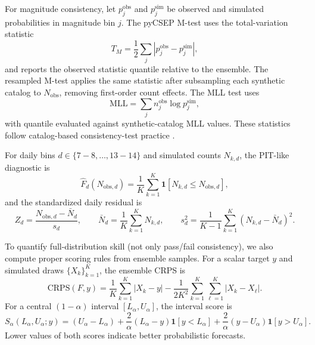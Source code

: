 \documentclass[12pt,letterpaper]{article}
\begin{document}
For magnitude consistency, let $p^{\mathrm{obs}}_j$ and $p^{\mathrm{sim}}_j$
be observed and simulated probabilities in magnitude bin $j$. The pyCSEP
M-test uses the total-variation statistic
\begin{equation}
T_M = \frac{1}{2}\sum_{j}\left|p^{\mathrm{obs}}_j-p^{\mathrm{sim}}_j\right|,
\label{eq:mtest_tv}
\end{equation}
and reports the observed statistic quantile relative to the ensemble. The
resampled M-test applies the same statistic after subsampling each synthetic
catalog to $N_{\mathrm{obs}}$, removing first-order count effects. The MLL
test uses
\begin{equation}
\mathrm{MLL} = \sum_j n^{\mathrm{obs}}_j \log p^{\mathrm{sim}}_j,
\label{eq:mll}
\end{equation}
with quantile evaluated against synthetic-catalog MLL values.
These statistics follow catalog-based consistency-test practice
\cite{savran2020}.

For daily bins $d\in\{7\!-\!8,\ldots,13\!-\!14\}$ and simulated counts
$N_{k,d}$, the PIT-like diagnostic is
\begin{equation}
\hat F_d(N_{\mathrm{obs},d})=
\frac{1}{K}\sum_{k=1}^K \mathbf{1}[N_{k,d}\le N_{\mathrm{obs},d}],
\label{eq:daily_pit}
\end{equation}
and the standardized daily residual is
\begin{equation}
Z_d=\frac{N_{\mathrm{obs},d}-\bar N_d}{s_d},
\qquad
\bar N_d=\frac{1}{K}\sum_{k=1}^K N_{k,d},
\qquad
s_d^2=\frac{1}{K-1}\sum_{k=1}^K (N_{k,d}-\bar N_d)^2.
\label{eq:daily_z}
\end{equation}

To quantify full-distribution skill (not only pass/fail consistency), we also
compute proper scoring rules from ensemble samples. For a scalar target $y$
and simulated draws $\{X_k\}_{k=1}^K$, the ensemble CRPS is
\begin{equation}
\mathrm{CRPS}(F,y)=
\frac{1}{K}\sum_{k=1}^K |X_k-y|
-\frac{1}{2K^2}\sum_{k=1}^K\sum_{\ell=1}^K |X_k-X_\ell|.
\label{eq:crps}
\end{equation}
For a central $(1-\alpha)$ interval $[L_\alpha,U_\alpha]$, the interval score
is
\begin{equation}
S_\alpha(L_\alpha,U_\alpha;y)=
(U_\alpha-L_\alpha)
+\frac{2}{\alpha}(L_\alpha-y)\mathbf{1}[y<L_\alpha]
+\frac{2}{\alpha}(y-U_\alpha)\mathbf{1}[y>U_\alpha].
\label{eq:interval_score}
\end{equation}
Lower values of both scores indicate better probabilistic forecasts.
\end{document}
